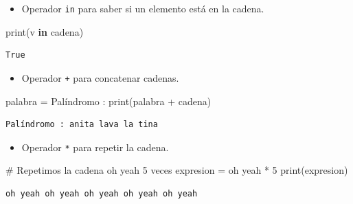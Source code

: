 \documentclass[
  spanish,
  letterpaper,
]{scrbook}
\newenvironment{Shaded}{\begin{snugshade}}{\end{snugshade}}
\newcommand{\BuiltInTok}[1]{\textcolor[rgb]{0.00,0.23,0.31}{#1}}
\newcommand{\CommentTok}[1]{\textcolor[rgb]{0.37,0.37,0.37}{#1}}
\newcommand{\DecValTok}[1]{\textcolor[rgb]{0.68,0.00,0.00}{#1}}
\newcommand{\KeywordTok}[1]{\textcolor[rgb]{0.00,0.23,0.31}{\textbf{#1}}}
\newcommand{\NormalTok}[1]{\textcolor[rgb]{0.00,0.23,0.31}{#1}}
\newcommand{\OperatorTok}[1]{\textcolor[rgb]{0.37,0.37,0.37}{#1}}
\newcommand{\StringTok}[1]{\textcolor[rgb]{0.13,0.47,0.30}{#1}}
\providecommand{\tightlist}{%
  \setlength{\itemsep}{0pt}\setlength{\parskip}{0pt}}
\theoremstyle{definition}
\theoremstyle{remark}
\begin{document}
\begin{itemize}
\tightlist
\item
  Operador \texttt{in} para saber si un elemento está en la cadena.
\end{itemize}

\begin{Shaded}
\begin{Highlighting}[]
\BuiltInTok{print}\NormalTok{(}\StringTok{\textquotesingle{}v\textquotesingle{}} \KeywordTok{in}\NormalTok{ cadena)}
\end{Highlighting}
\end{Shaded}

\begin{verbatim}
True
\end{verbatim}

\begin{itemize}
\tightlist
\item
  Operador \texttt{+} para concatenar cadenas.
\end{itemize}

\begin{Shaded}
\begin{Highlighting}[]
\NormalTok{palabra }\OperatorTok{=} \StringTok{\textquotesingle{}Palíndromo : \textquotesingle{}}
\BuiltInTok{print}\NormalTok{(palabra }\OperatorTok{+}\NormalTok{ cadena)}
\end{Highlighting}
\end{Shaded}

\begin{verbatim}
Palíndromo : anita lava la tina
\end{verbatim}

\begin{itemize}
\tightlist
\item
  Operador \texttt{*} para repetir la cadena.
\end{itemize}

\begin{Shaded}
\begin{Highlighting}[]
\CommentTok{\# Repetimos la cadena \textquotesingle{}oh yeah \textquotesingle{} 5 veces}
\NormalTok{expresion }\OperatorTok{=} \StringTok{\textquotesingle{}oh yeah \textquotesingle{}} \OperatorTok{*} \DecValTok{5}
\BuiltInTok{print}\NormalTok{(expresion)}
\end{Highlighting}
\end{Shaded}

\begin{verbatim}
oh yeah oh yeah oh yeah oh yeah oh yeah 
\end{verbatim}
\end{document}
